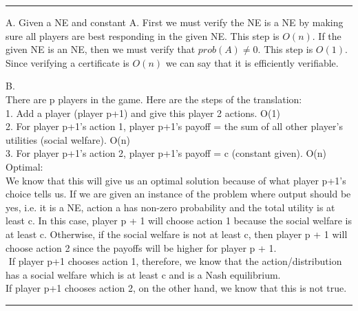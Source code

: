 \documentclass[11pt]{article}
\newcommand{\answer}[1]{
\vspace{.5\baselineskip} \hrule \vspace{.5\baselineskip}
#1
\vspace{.5\baselineskip} \hrule \vspace{.5\baselineskip}
}
\begin{document}
\answer{

A. \newline
Given a NE and constant A. First we must verify the NE is a NE by making sure all players are best responding in the given NE. This step is $O(n)$. If the given NE is an NE, then we must verify that $prob(A) \neq 0$. This step is $O(1)$. Since verifying a certificate is $O(n)$ we can say that it is efficiently verifiable.

B. \\
There are p players in the game.  Here are the steps of the translation:\\
1. Add a player (player p+1) and give this player 2 actions. O(1)\\
2. For player p+1's action 1, player p+1's payoff = the sum of all other player's utilities (social welfare). O(n)\\
3. For player p+1's action 2, player p+1's payoff = c (constant given).  O(n)\\

Optimal:\\
We know that this will give us an optimal solution because of what player p+1's choice tells us.  If we are given an instance of the problem where output should be yes, i.e. it is a NE, action a has non-zero probability and the total utility is at least c.  In this case, player p + 1 will choose action 1 because the social welfare is at least c.  Otherwise, if the social welfare is not at least c, then player p + 1 will choose action 2 since the payoffs will be higher for player p + 1.\\
$ $\newline
If player p+1 chooses action 1, therefore, we know that the action/distribution has a social welfare which is at least c and is a Nash equilibrium.\\
If player p+1 chooses action 2, on the other hand, we know that this is not true.


}
\end{document}
